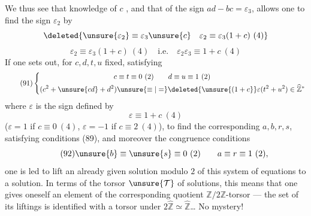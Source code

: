 We thus see that knowledge of $c$ 
, and that of the sign $ad-bc=\varepsilon_3$,
allows one to find the sign $\varepsilon_2$  by
\[
\deleted{\unsure{\varepsilon_2}\equiv\varepsilon_3\unsure{c}\quad
\varepsilon_2\equiv\varepsilon_3(1+c)\ (4)}
\]
\[
\tag{90}
\varepsilon_2\equiv\varepsilon_3(1+c)\ (4)
\quad\text{i.e.}\quad
\varepsilon_2\varepsilon_3\equiv1+c\ (4)
\]
If one sets out, for $c,d,t,u$ fixed, satisfying
\[
\tag{91}
\left\{\begin{aligned}
c&\equiv t\equiv0\ (2)\qquad d\equiv u\equiv1\ (2)\\
(c^2+\unsure{cd}+d^2)&\unsure{\equiv|=}\deleted{\unsure{(1+c}}
\varepsilon(t^2+u^2)\in\widehat{\mathbb Z}^{*}
\end{aligned}\right.
\]
where $\varepsilon$ 
is the sign defined by
\[
\varepsilon\equiv1+c\ (4)
\]
($\varepsilon=1$ if $c\equiv0\ (4)$, $\varepsilon=-1$ if
$c\equiv2\ (4)$), to find the corresponding $a,b,r,s$,
satisfying conditions (89), and moreover the congruence conditions
\[
\tag{92}
\unsure{b}\equiv\unsure{s}\equiv0\ (2)\qquad
a\equiv r\equiv1\ (2),
\]
one is led to lift an already given solution modulo $2$ of this system
of equations to a solution. In terms of the 
torsor $\unsure{\mathcal T}$ of solutions, this means that one gives oneself
an element of the corresponding quotient $\mathbb Z/2\mathbb Z$-torsor
--- the set of its liftings is identified with a torsor under
$2\widehat{\mathbb Z}\simeq\widehat{\mathbb Z}$\ldots{} No mystery!



